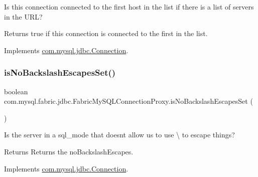 Is this connection connected to the first host in the list if there is a list of servers in the U\+RL?

\begin{DoxyReturn}{Returns}
true if this connection is connected to the first in the list. 
\end{DoxyReturn}


Implements \mbox{\hyperlink{interfacecom_1_1mysql_1_1jdbc_1_1_connection_a39d6c162da8f21b7c2a3299f91e7c65a}{com.\+mysql.\+jdbc.\+Connection}}.

\mbox{\label{classcom_1_1mysql_1_1fabric_1_1jdbc_1_1_fabric_my_s_q_l_connection_proxy_a80232087afb30150542cb3f36aa5d66b}} 
\subsubsection{\texorpdfstring{is\+No\+Backslash\+Escapes\+Set()}{isNoBackslashEscapesSet()}}
{\footnotesize\ttfamily boolean com.\+mysql.\+fabric.\+jdbc.\+Fabric\+My\+S\+Q\+L\+Connection\+Proxy.\+is\+No\+Backslash\+Escapes\+Set (\begin{DoxyParamCaption}{ }\end{DoxyParamCaption})}

Is the server in a sql\+\_\+mode that doesn\textquotesingle{}t allow us to use \textbackslash{} to escape things?

\begin{DoxyReturn}{Returns}
Returns the no\+Backslash\+Escapes. 
\end{DoxyReturn}


Implements \mbox{\hyperlink{interfacecom_1_1mysql_1_1jdbc_1_1_connection_a3465592f69365c9572cc404ae04375b4}{com.\+mysql.\+jdbc.\+Connection}}.

\mbox{\label{classcom_1_1mysql_1_1fabric_1_1jdbc_1_1_fabric_my_s_q_l_connection_proxy_ae661cd405492617e9cea0fec851dbac1}} 

